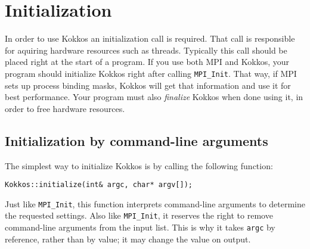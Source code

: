 
\chapter{Initialization}\label{C:init}

In order to use Kokkos an initialization call is required. 
That call is responsible for aquiring hardware resources such as threads. 
Typically this call should be placed right at the start of a program.
If you use both MPI and Kokkos, your program should initialize Kokkos right after calling \lstinline!MPI_Init!.
That way, if MPI sets up process binding masks,
Kokkos will get that information and use it for best performance.
Your program must also \emph{finalize} Kokkos when done using it,
in order to free hardware resources.


\section{Initialization by command-line arguments}\label{S:init:cmdline}

The simplest way to initialize Kokkos is by calling the following function:
\begin{lstlisting}
Kokkos::initialize(int& argc, char* argv[]); 
\end{lstlisting}
Just like \lstinline!MPI_Init!, this function interprets command-line arguments to determine the requested settings.
Also like \lstinline!MPI_Init!, it reserves the right to remove command-line arguments from the input list.
This is why it takes \lstinline!argc! by reference, rather than by value; it may change the value on output.

